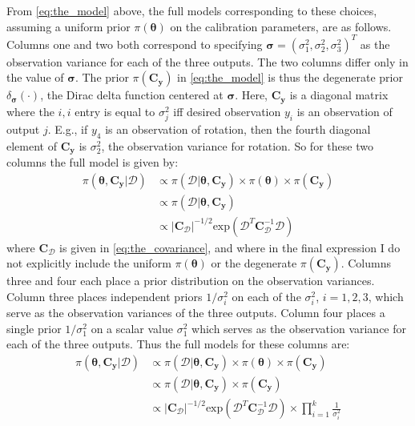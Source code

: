 \documentclass{article}
\begin{document}
From \eqref{eq:the_model} above, the full models corresponding to these choices, assuming a uniform prior $\pi(\boldsymbol\theta)$ on the calibration parameters, are as follows. Columns one and two both correspond to specifying $\boldsymbol \sigma = (\sigma^2_1,\sigma^2_2,\sigma^2_3)^T$ as the observation variance for each of the three outputs. The two columns differ only in the value of $\boldsymbol \sigma$. The prior $\pi(\mathbf C_{\mathbf y})$ in \eqref{eq:the_model} is thus the degenerate prior $\delta_{\boldsymbol\sigma}(\cdot)$, the Dirac delta function centered at $\boldsymbol \sigma$. Here, $\mathbf C_{\mathbf y}$ is a diagonal matrix where the $i,i$ entry is equal to $\sigma^2_j$ iff desired observation $y_i$ is an observation of output $j$. E.g., if $y_4$ is an observation of rotation, then the fourth diagonal element of $\mathbf C_{\mathbf y}$ is $\sigma^2_2$, the observation variance for rotation. So for these two columns the full model is given by:
\begin{equation}\label{eq:full_model_1}
\begin{aligned}
\pi(\boldsymbol\theta,\mathbf C_{\mathbf y}|\mathcal D) &\propto \pi(\mathcal D|\boldsymbol\theta,\mathbf C_{\mathbf y}) \times \pi(\boldsymbol\theta) \times \pi(\mathbf C_{\mathbf y})\\
&\propto \pi(\mathcal D|\boldsymbol\theta,\mathbf C_{\mathbf y}) \\
&\propto \lvert \mathbf C_{\mathcal D} \rvert ^{-1/2} \mathrm{exp}(\mathcal D^T \mathbf C_{\mathcal D}^{-1} \mathcal D)
\end{aligned}
\end{equation}
where $\mathbf C_{\mathcal D}$ is given in \eqref{eq:the_covariance}, and where in the final expression I do not explicitly include the uniform $\pi(\boldsymbol\theta)$ or the degenerate $\pi(\mathbf C_{\mathbf y})$.
Columns three and four each place a prior distribution on the observation variances. Column three places independent priors $1/\sigma^2_i$ on each of the $\sigma^2_i$, $i=1,2,3$, which serve as the observation variances of the three outputs. Column four places a single prior $1/\sigma^2_1$ on a scalar value $\sigma^2_1$ which serves as the observation variance for each of the three outputs. Thus the full models for these columns are:
\begin{equation}\label{eq:full_model_2}
\begin{aligned}
\pi(\boldsymbol\theta,\mathbf C_{\mathbf y}|\mathcal D ) &\propto
\pi(\mathcal D|\boldsymbol\theta,\mathbf C_{\mathbf y}) \times \pi(\boldsymbol\theta) \times \pi(\mathbf C_{\mathbf y})\\
&\propto  \pi(\mathcal D|\boldsymbol\theta,\mathbf C_{\mathbf y}) \times \pi(\mathbf C_{\mathbf y})\\
&\propto \lvert \mathbf C_{\mathcal D} \rvert ^{-1/2} \mathrm{exp}(\mathcal D^T \mathbf C_{\mathcal D}^{-1} \mathcal D) \times \prod_{i=1}^k \frac1{\sigma^2_i}
\end{aligned}
\end{equation}
\end{document}
